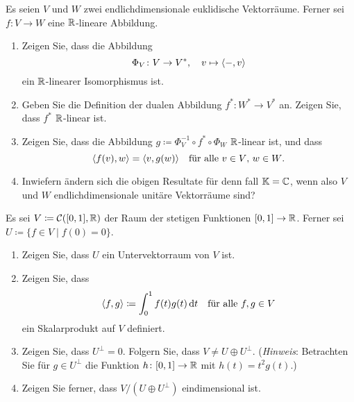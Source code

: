 \documentclass[a4paper,10pt]{scrartcl}
\begin{document}


\begin{question}
  Es seien $V$ und $W$ zwei endlichdimensionale euklidische Vektorräume.
  Ferner sei $f \colon V \to W$ eine $\mathbb{R}$-lineare Abbildung.
  \begin{enumerate}[leftmargin=*]
    \item
      Zeigen Sie, dass die Abbildung
      \[
        \Phi_V \colon V \to V^*,
        \quad
        v \mapsto \langle -, v \rangle
      \]
      ein $\mathbb{R}$-linearer Isomorphismus ist.
    \item
      Geben Sie die Definition der dualen Abbildung $f^* \colon W^* \to V^*$ an.
      Zeigen Sie, dass $f^*$ $\mathbb{R}$-linear ist.
    \item
      Zeigen Sie, dass die Abbildung $g \coloneqq \Phi_V^{-1} \circ f^* \circ \Phi_W$ $\mathbb{R}$-linear ist, und dass
      \[
        \langle f(v), w \rangle = \langle v, g(w) \rangle
        \quad
        \text{für alle $v \in V$, $w \in W$}.
      \]
    \item
      Inwiefern ändern sich die obigen Resultate für denn fall $\mathbb{K} = \mathbb{C}$, wenn also $V$ und $W$ endlichdimensionale unitäre Vektorräume sind?
  \end{enumerate}
\end{question}


\begin{question}
  Es sei $V \coloneqq \mathcal{C}([0,1], \mathbb{R})$ der Raum der stetigen Funktionen $[0,1] \to \mathbb{R}$.
  Ferner sei $U \coloneqq \{f \in V \mid f(0) = 0\}$.
  \begin{enumerate}[leftmargin=*]
    \item
      Zeigen Sie, dass $U$ ein Untervektorraum von $V$ ist.
    \item
      Zeigen Sie, dass
      \[
        \langle f, g \rangle \coloneqq \int_0^1 f(t) g(t) \,\text{d}t
        \quad
        \text{für alle $f, g \in V$}
      \]
      ein Skalarprodukt auf $V$ definiert.
    \item
      Zeigen Sie, dass $U^\perp = 0$.
      Folgern Sie, dass $V \neq U \oplus U^\perp$.
      (\emph{Hinweis}: Betrachten Sie für $g \in U^\perp$ die Funktion $h \colon [0,1] \to \mathbb{R}$ mit $h(t) = t^2 g(t)$.)
    \item
      Zeigen Sie ferner, dass $V/(U \oplus U^\perp)$ eindimensional ist.
  \end{enumerate}
\end{question}
\end{document}

